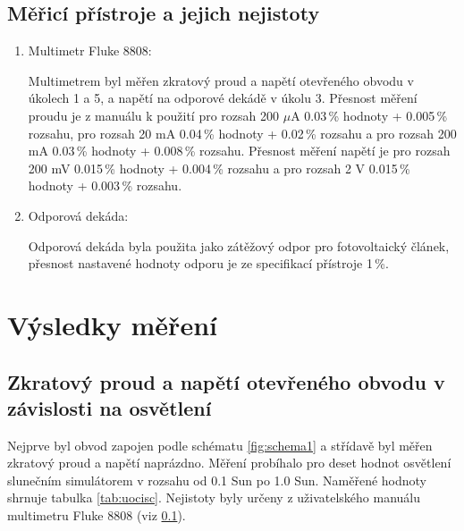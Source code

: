 \documentclass{../concepts/prepareprotokol} %
\begin{document}
\subsection{Měřicí přístroje a jejich nejistoty} \label{pristroje}
\begin{enumerate}
    \item Multimetr Fluke 8808:
    
     Multimetrem byl měřen zkratový proud a napětí otevřeného obvodu v úkolech 1 a 5, a napětí na odporové dekádě v úkolu 3. Přesnost měření proudu je z manuálu k použití pro rozsah 200 $\mu$A 0.03\,\% hodnoty + 0.005\,\% rozsahu, pro rozsah 20 mA 0.04\,\% hodnoty + 0.02\,\% rozsahu a pro rozsah 200 mA 0.03\,\% hodnoty + 0.008\,\% rozsahu. Přesnost měření napětí je pro rozsah 200 mV 0.015\,\% hodnoty + 0.004\,\% rozsahu a pro rozsah 2 V 0.015\,\% hodnoty + 0.003\,\% rozsahu.

    \item Odporová dekáda:

     Odporová dekáda byla použita jako zátěžový odpor pro fotovoltaický článek, přesnost nastavené hodnoty odporu je ze specifikací přístroje 1\,\%.

\end{enumerate}
\def\figurename{Graf}%
\setcounter{figure}{0}

\section{Výsledky měření}
\subsection{Zkratový proud a napětí otevřeného obvodu v závislosti na osvětlení}

Nejprve byl obvod zapojen podle schématu \ref{fig:schema1} a střídavě byl měřen zkratový proud a napětí naprázdno. Měření probíhalo pro deset hodnot osvětlení slunečním simulátorem v rozsahu od 0.1 Sun po 1.0 Sun. Naměřené hodnoty shrnuje tabulka \ref{tab:uocisc}. Nejistoty byly určeny z uživatelského manuálu multimetru Fluke 8808 (viz \ref{pristroje}).
\end{document}
